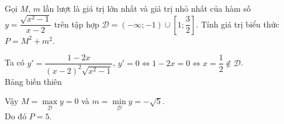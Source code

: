 \begin{ex}%
    Gọi $ M $, $ m $ lần lượt là giá trị lớn nhất và giá trị nhỏ nhất của hàm số $ y=\dfrac{\sqrt{x^2-1}}{x-2} $ trên tập hợp $ \mathscr{D}=(-\infty;-1)\cup\left[ 1;\dfrac{3}{2} \right] $. Tính giá trị biểu thức $ P=M^2+m^2$.
    \loigiai
    {
        Ta có $ y'=\dfrac{1-2x}{(x-2)^2\sqrt{x^2-1}} $, $ y'=0\Leftrightarrow 1-2x=0 \Leftrightarrow x=\dfrac{1}{2}\notin\mathscr{D}$.\\
        Bảng biến thiên
        \begin{center}
        \end{center}
        Vậy $ M=\max\limits_{\mathscr{D}}y=0 $ và $ m=\min\limits_{\mathscr{D}}y=-\sqrt{5} $.\\
        Do đó $ P=5$.
    }
\end{ex}
